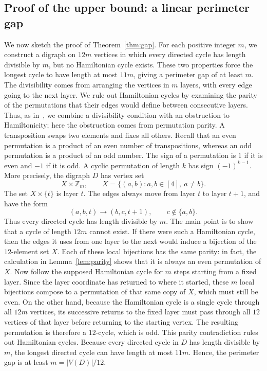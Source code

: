 \documentclass[11pt,a4paper,reqno]{amsart}
\theoremstyle{definition}
\theoremstyle{remark}
\numberwithin{equation}{section}
\newcommand{\Z}{\mathbb Z}
\begin{document}
\subsection{Proof of the upper bound: a linear perimeter gap}\label{subsec:gap-overview}
We now sketch the proof of Theorem~\ref{thm:gap}. For each positive integer $m$, we construct a digraph on $12m$ vertices in which every directed cycle has length divisible by $m$, but no Hamiltonian cycle exists. These two properties force the longest cycle to have length at most $11m$, giving a perimeter gap of at least $m$. The divisibility comes from arranging the vertices in $m$ layers, with every edge going to the next layer. We rule out Hamiltonian cycles by examining the parity of the permutations that their edges would define between consecutive layers. Thus, as in~\cite{BHMSY}, we combine a divisibility condition with an obstruction to Hamiltonicity; here the obstruction comes from permutation parity. A transposition swaps two elements and fixes all others. Recall that an even permutation is a product of an even number of transpositions, whereas an odd permutation is a product of an odd number. The sign of a permutation is $1$ if it is even and $-1$ if it is odd. A cyclic permutation of length $k$ has sign $(-1)^{k-1}$. More precisely, the digraph $D$ has vertex set
\[
 X\times\Z_m,\qquad X=\{(a,b):a,b\in[4],\ a\ne b\}.
\]
The set $X\times\{t\}$ is layer $t$. The edges always move from layer $t$ to layer $t+1$, and have the form
\[
 (a,b,t)\longrightarrow(b,c,t+1),\qquad c\notin\{a,b\}.
\]
Thus every directed cycle has length divisible by $m$. The main point is to show that a cycle of length $12m$ cannot exist. If there were such a Hamiltonian cycle, then the edges it uses from one layer to the next would induce a bijection of the $12$-element set $X$. Each of these local bijections has the same parity: in fact, the calculation in Lemma~\ref{lem:parity} shows that it is always an even permutation of $X$. Now follow the supposed Hamiltonian cycle for $m$ steps starting from a fixed layer. Since the layer coordinate has returned to where it started, these $m$ local bijections compose to a permutation of that same copy of $X$, which must still be even. On the other hand, because the Hamiltonian cycle is a single cycle through all $12m$ vertices, its successive returns to the fixed layer must pass through all $12$ vertices of that layer before returning to the starting vertex. The resulting permutation is therefore a $12$-cycle, which is odd. This parity contradiction rules out Hamiltonian cycles. Because every directed cycle in $D$ has length divisible by $m$, the longest directed cycle can have length at most $11m$. Hence, the perimeter gap is at least $m=|V(D)|/12$.
\end{document}
